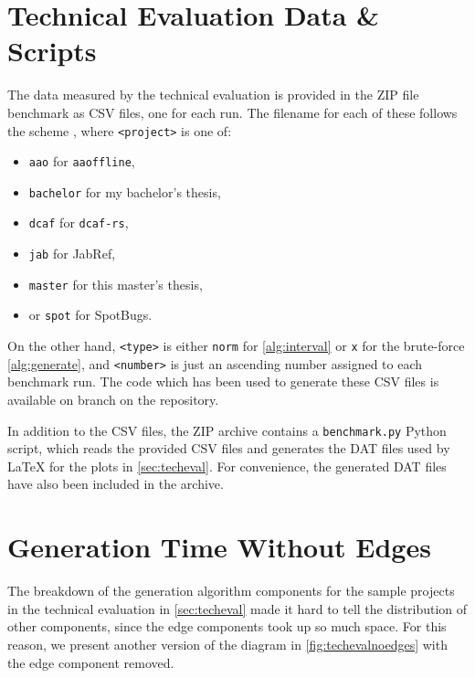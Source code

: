 \section{Technical Evaluation Data \& Scripts}\label{app:techdata}
The data measured by the technical evaluation is provided in the ZIP file \gls{benchmark} as CSV files, one for each run.
The filename for each of these follows the scheme , where \texttt{<project>} is one of:
\begin{itemize}
	\item \texttt{aao} for \texttt{aaoffline},
	\item \texttt{bachelor} for my bachelor's thesis,
	\item \texttt{dcaf} for \texttt{dcaf-rs},
	\item \texttt{jab} for JabRef,
	\item \texttt{master} for this master's thesis,
	\item or \texttt{spot} for SpotBugs.
\end{itemize}
On the other hand, \texttt{<type>} is either \texttt{norm} for \cref{alg:interval} or \texttt{x} for the brute-force \cref{alg:generate}, and \texttt{<number>} is just an ascending number assigned to each benchmark run.
The code which has been used to generate these CSV files is available on branch  on the \SEE{} repository.

In addition to the CSV files, the ZIP archive contains a \texttt{benchmark.py} Python script, which reads the provided CSV files and generates the DAT files used by \LaTeX{} for the plots in \cref{sec:techeval}.
For convenience, the generated DAT files have also been included in the archive.

\section{Generation Time Without Edges}\label{app:noedge}
The breakdown of the generation algorithm components for the sample projects in the technical evaluation in \cref{sec:techeval} made it hard to tell the distribution of other components, since the edge components took up so much space.
For this reason, we present another version of the diagram in \cref{fig:techevalnoedges} with the edge component removed.

